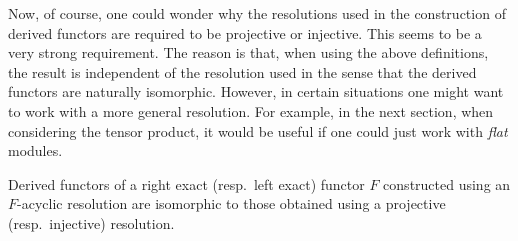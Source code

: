 	Now, of course, one could wonder why the resolutions used in the construction of derived functors are required to be projective or injective. This seems to be a very strong requirement. The reason is that, when using the above definitions, the result is independent of the resolution used in the sense that the derived functors are naturally isomorphic. However, in certain situations one might want to work with a more general resolution. For example, in the next section, when considering the tensor product, it would be useful if one could just work with \textit{flat} modules.
    \begin{property}\label{homalg:acyclic_derived_functors}
        Derived functors of a right exact (resp.~left exact) functor $F$ constructed using an $F$-acyclic resolution are isomorphic to those obtained using a projective (resp.~injective) resolution.
    \end{property}

